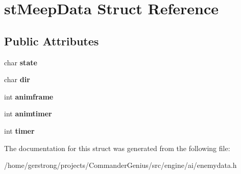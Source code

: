 \hypertarget{structst_meep_data}{
\section{stMeepData Struct Reference}
\label{structst_meep_data}
}
\subsection*{Public Attributes}
\begin{DoxyCompactItemize}
\item 
\hypertarget{structst_meep_data_ac274c26894276d7afde2072eae5f9cd6}{
char {\bfseries state}}
\label{structst_meep_data_ac274c26894276d7afde2072eae5f9cd6}

\item 
\hypertarget{structst_meep_data_ae17345c15ac1a2e048567d1ccd8d089c}{
char {\bfseries dir}}
\label{structst_meep_data_ae17345c15ac1a2e048567d1ccd8d089c}

\item 
\hypertarget{structst_meep_data_a289ae3be82a274741dfa2a3d7aef2e07}{
int {\bfseries animframe}}
\label{structst_meep_data_a289ae3be82a274741dfa2a3d7aef2e07}

\item 
\hypertarget{structst_meep_data_ae1af7de7f5e87a30fcc56e3fe511e812}{
int {\bfseries animtimer}}
\label{structst_meep_data_ae1af7de7f5e87a30fcc56e3fe511e812}

\item 
\hypertarget{structst_meep_data_ab62b2591e4be93cec22766e6d24b86d4}{
int {\bfseries timer}}
\label{structst_meep_data_ab62b2591e4be93cec22766e6d24b86d4}

\end{DoxyCompactItemize}


The documentation for this struct was generated from the following file:\begin{DoxyCompactItemize}
\item 
/home/gerstrong/projects/CommanderGenius/src/engine/ai/enemydata.h\end{DoxyCompactItemize}
